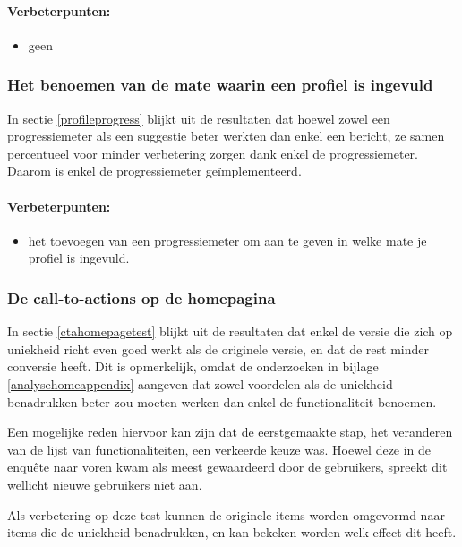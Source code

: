 \documentclass[a4paper, 10pt, pdftex]{report}
\begin{document}
    \paragraph{\textbf{Verbeterpunten:}}
      \begin{itemize}
        \item geen
      \end{itemize}

      \subsubsection{Het benoemen van de mate waarin een profiel is ingevuld}
        In sectie \ref{profileprogress} blijkt uit de resultaten dat hoewel zowel een progressiemeter als een suggestie beter werkten dan enkel een bericht, ze samen percentueel voor minder verbetering zorgen dank enkel de progressiemeter. Daarom is enkel de progressiemeter ge\"implementeerd.

    \paragraph{\textbf{Verbeterpunten:}}
      \begin{itemize}
        \item het toevoegen van een progressiemeter om aan te geven in welke mate je profiel is ingevuld.
      \end{itemize}

     \subsubsection{De call-to-actions op de homepagina}
      \label{wak:ctahome}
      In sectie \ref{ctahomepagetest} blijkt uit de resultaten dat enkel de versie die zich op uniekheid richt even goed werkt als de originele versie, en dat de rest minder conversie heeft. Dit is opmerkelijk, omdat de onderzoeken in bijlage \ref{analysehomeappendix} aangeven dat zowel voordelen als de uniekheid benadrukken beter zou moeten werken dan enkel de functionaliteit benoemen.

      Een mogelijke reden hiervoor kan zijn dat de eerstgemaakte stap, het veranderen van de lijst van functionaliteiten, een verkeerde keuze was. Hoewel deze in de enqu\^ete naar voren kwam als meest gewaardeerd door de gebruikers, spreekt dit wellicht nieuwe gebruikers niet aan.

      Als verbetering op deze test kunnen de originele items worden omgevormd naar items die de uniekheid benadrukken, en kan bekeken worden welk effect dit heeft.
\end{document}
